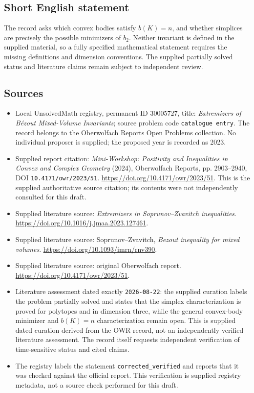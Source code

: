 \documentclass[11pt]{article}
\begin{document}
\subsection{Short English statement}
The record asks which convex bodies satisfy \(b(K)=n\), and whether simplices are precisely the possible minimizers of \(b_2\). Neither invariant is defined in the supplied material, so a fully specified mathematical statement requires the missing definitions and dimension conventions. The supplied partially solved status and literature claims remain subject to independent review.
\subsection{Sources}
\begin{itemize}
\item Local UnsolvedMath registry, permanent ID \(30005727\), title: \emph{Extremizers of B\'ezout Mixed-Volume Invariants}; source problem code \texttt{catalogue entry}. The record belongs to the Oberwolfach Reports Open Problems collection. No individual proposer is supplied; the proposed year is recorded as 2023.
\item Supplied report citation: \emph{Mini-Workshop: Positivity and Inequalities in Convex and Complex Geometry} (2024), Oberwolfach Reports, pp. 2903--2940, DOI \texttt{10.4171/owr/2023/51}. \url{https://doi.org/10.4171/owr/2023/51}. This is the supplied authoritative source citation; its contents were not independently consulted for this draft.
\item Supplied literature source: \emph{Extremizers in Soprunov--Zvavitch inequalities}. \url{https://doi.org/10.1016/j.jmaa.2023.127461}.
\item Supplied literature source: Soprunov--Zvavitch, \emph{Bezout inequality for mixed volumes}. \url{https://doi.org/10.1093/imrn/rnv390}.
\item Supplied literature source: original Oberwolfach report. \url{https://doi.org/10.4171/owr/2023/51}.
\item Literature assessment dated exactly \texttt{2026-08-22}: the supplied curation labels the problem partially solved and states that the simplex characterization is proved for polytopes and in dimension three, while the general convex-body minimizer and \(b(K)=n\) characterization remain open. This is supplied dated curation derived from the OWR record, not an independently verified literature assessment. The record itself requests independent verification of time-sensitive status and cited claims.
\item The registry labels the statement \texttt{corrected\_verified} and reports that it was checked against the official report. This verification is supplied registry metadata, not a source check performed for this draft.
\end{itemize}
\end{document}
